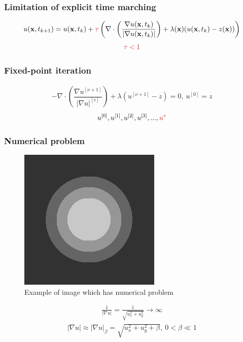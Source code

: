 \documentclass[xcolor=dvipsnames, xetex,serif]{beamer}
\begin{document}
    \begin{frame}
        \frametitle{Limitation of explicit time marching}
        \begin{align*}
        u(\mathbf{x},t_{k+1})=u(\mathbf{x},t_{k})+ \textcolor{red}{\tau}\left(\nabla \cdot\left(\dfrac{\nabla u (\mathbf{x},t_k)}{| \nabla u (\mathbf{x},t_k) | }\right) + \lambda(\mathbf{x})(u (\mathbf{x},t_k)-z(\mathbf{x})) \right)
        \end{align*}
        \vspace{1cm}
        \begin{align*}
            \textcolor{red}{\tau < 1}
        \end{align*}
    \end{frame} 
    \begin{frame}
        \frametitle{Fixed-point iteration}
        \begin{align*}
            - \nabla\cdot\left(\dfrac{\nabla u^{[\nu+1]}}{{| \nabla u |}^{[v]} }\right) + \lambda(u^{[\nu+1]}-z)  = 0,\ u^{[0]}=z
        \end{align*}
        \vspace{1cm}
        \begin{align*}
        u^{[0]}, u^{[1]}, u^{[2]}, u^{[3]}, ..., \textcolor{red}{u^{*}}    
        \end{align*}
        \let\thefootnote\relax{}
    \end{frame} 
    \begin{frame}
        \frametitle{Numerical problem}
        \begin{figure}[H]
            \centering
            \includegraphics[width=0.2\linewidth]{images/grayscale_inpaint/result_splitbergman.png}
            \caption{Example of image which has numerical problem}
        \end{figure}
        \begin{align*}
            \tfrac{1}{| \nabla u |}=\tfrac{1}{\sqrt{u_x^2+u_y^2}} \rightarrow \infty
        \end{align*}
        \begin{align*}
            |\nabla u| \approx| \nabla u |_\beta=\sqrt{u_x^2+u_y^2+\beta},\ 0< \beta \ll 1
        \end{align*}
    \end{frame}
\end{document}
